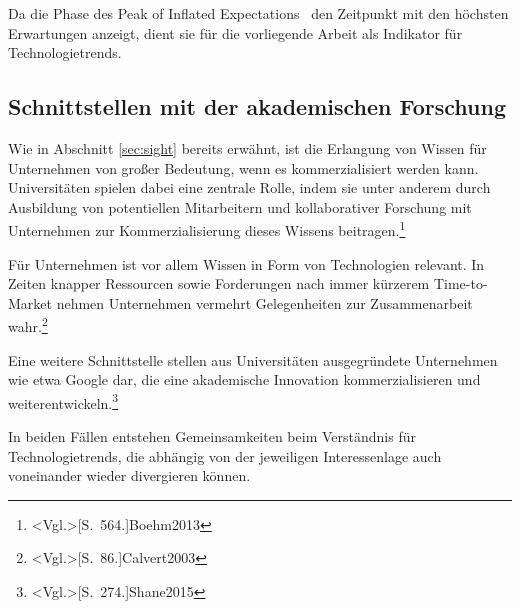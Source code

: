 Da die Phase des \glqq Peak of Inflated Expectations\grqq~ den Zeitpunkt mit den höchsten Erwartungen anzeigt, dient sie für die vorliegende Arbeit als Indikator für Technologietrends.

\subsection{Schnittstellen mit der akademischen Forschung}
Wie in Abschnitt \ref{sec:sight} bereits erwähnt, ist die Erlangung von Wissen für Unternehmen von großer Bedeutung, wenn es kommerzialisiert werden kann. Universitäten spielen dabei eine zentrale Rolle, indem sie unter anderem durch Ausbildung von potentiellen Mitarbeitern und kollaborativer Forschung mit Unternehmen zur Kommerzialisierung dieses Wissens beitragen.\footnote{\citeNP<Vgl.>[S.~564.]{Boehm2013}}

Für Unternehmen ist vor allem Wissen in Form von Technologien relevant. In Zeiten knapper Ressourcen sowie Forderungen nach immer kürzerem Time-to-Market nehmen Unternehmen vermehrt Gelegenheiten zur Zusammenarbeit wahr.\footnote{\citeNP<Vgl.>[S.~86.]{Calvert2003}}

Eine weitere Schnittstelle stellen aus Universitäten ausgegründete Unternehmen wie etwa Google dar, die eine akademische Innovation kommerzialisieren und weiterentwickeln.\footnote{\citeNP<Vgl.>[S.~274.]{Shane2015}}

In beiden Fällen entstehen Gemeinsamkeiten beim Verständnis für Technologietrends, die abhängig von der jeweiligen Interessenlage auch voneinander wieder divergieren können.